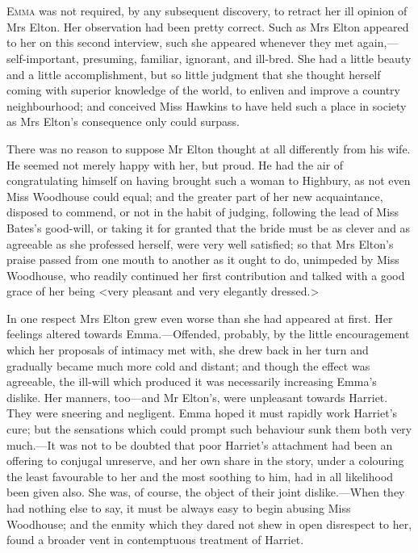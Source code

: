 \chapter[Chapter \thechapter]{}
\lettrine[lraise=0.3]{E}{mma} was not required, by any subsequent discovery, to retract her ill opinion of Mrs Elton. Her observation had been pretty correct. Such as Mrs Elton appeared to her on this second interview, such she appeared whenever they met again,—self-important, presuming, familiar, ignorant, and ill-bred. She had a little beauty and a little accomplishment, but so little judgment that she thought herself coming with superior knowledge of the world, to enliven and improve a country neighbourhood; and conceived Miss Hawkins to have held such a place in society as Mrs Elton's consequence only could surpass.

There was no reason to suppose Mr Elton thought at all differently from his wife. He seemed not merely happy with her, but proud. He had the air of congratulating himself on having brought such a woman to Highbury, as not even Miss Woodhouse could equal; and the greater part of her new acquaintance, disposed to commend, or not in the habit of judging, following the lead of Miss Bates's good-will, or taking it for granted that the bride must be as clever and as agreeable as she professed herself, were very well satisfied; so that Mrs Elton's praise passed from one mouth to another as it ought to do, unimpeded by Miss Woodhouse, who readily continued her first contribution and talked with a good grace of her being <very pleasant and very elegantly dressed.>

In one respect Mrs Elton grew even worse than she had appeared at first. Her feelings altered towards Emma.—Offended, probably, by the little encouragement which her proposals of intimacy met with, she drew back in her turn and gradually became much more cold and distant; and though the effect was agreeable, the ill-will which produced it was necessarily increasing Emma's dislike. Her manners, too—and Mr Elton's, were unpleasant towards Harriet. They were sneering and negligent. Emma hoped it must rapidly work Harriet's cure; but the sensations which could prompt such behaviour sunk them both very much.—It was not to be doubted that poor Harriet's attachment had been an offering to conjugal unreserve, and her own share in the story, under a colouring the least favourable to her and the most soothing to him, had in all likelihood been given also. She was, of course, the object of their joint dislike.—When they had nothing else to say, it must be always easy to begin abusing Miss Woodhouse; and the enmity which they dared not shew in open disrespect to her, found a broader vent in contemptuous treatment of Harriet.

